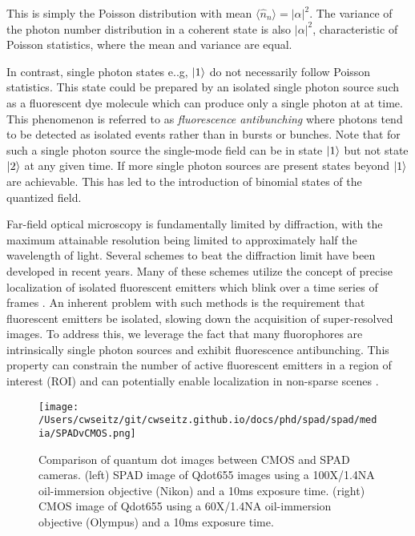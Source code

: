 This is simply the Poisson distribution with mean $\langle \hat{n}_n \rangle = \lvert\alpha\lvert^2$. The variance of the photon number distribution in a coherent state is also $\lvert\alpha\lvert^2$, characteristic of Poisson statistics, where the mean and variance are equal. 

In contrast, single photon states e..g, $\ket{1}$ do not necessarily follow Poisson statistics. This state could be prepared by an isolated single photon source such as a fluorescent dye molecule which can produce only a single photon at at time. This phenomenon is referred to as \emph{fluorescence antibunching} where photons tend to be detected as isolated events rather than in bursts or bunches. Note that for such a single photon source the single-mode field can be in state $\ket{1}$ but not state $\ket{2}$ at any given time. If more single photon sources are present states beyond $\ket{1}$ are achievable. This has led to the introduction of binomial states of the quantized field.


Far-field optical microscopy is fundamentally limited by diffraction, with the maximum attainable resolution being limited to approximately half the wavelength of light. Several schemes to beat the diffraction limit have been developed in recent years. Many of these schemes utilize the concept of precise localization of isolated fluorescent emitters which blink over a time series of frames \parencite{Rust2006,Betzig2006}. An inherent problem with such methods is the requirement that fluorescent emitters be isolated, slowing down the acquisition of super-resolved images. To address this, we leverage the fact that many fluorophores are intrinsically single photon sources and exhibit fluorescence antibunching. This property can constrain the number of active fluorescent emitters in a region of interest (ROI) and can potentially enable localization in non-sparse scenes \parencite{Ta2010,Israel2017}. 

\begin{figure*}[t]
\centering
\texttt{[image: /Users/cwseitz/git/cwseitz.github.io/docs/phd/spad/spad/media/SPADvCMOS.png]}
\caption{Comparison of quantum dot images between CMOS and SPAD cameras. (left) SPAD image of Qdot655 images using a 100X/1.4NA oil-immersion objective (Nikon) and a 10ms exposure time. (right) CMOS image of Qdot655 using a 60X/1.4NA oil-immersion objective (Olympus) and a 10ms exposure time.}
\end{figure*}    

